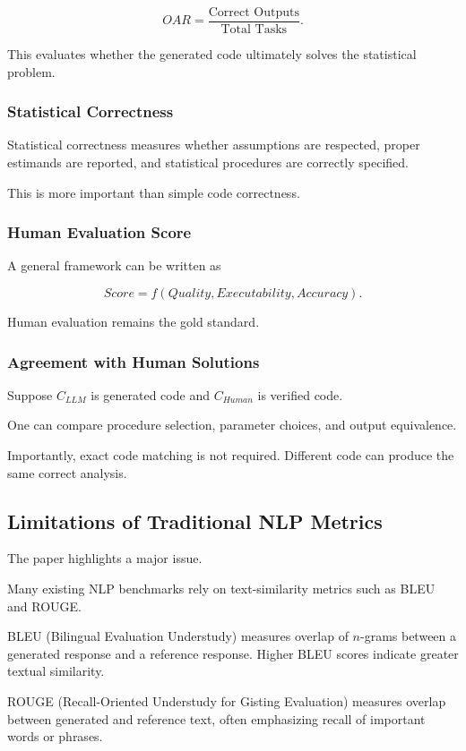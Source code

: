\documentclass[11pt]{article}
\begin{document}
\[OAR=\frac{\text{Correct Outputs}}{\text{Total Tasks}}.\]

This evaluates whether the generated code ultimately solves the statistical problem.

\subsubsection*{Statistical Correctness}

Statistical correctness measures whether assumptions are respected, proper estimands are reported, and statistical procedures are correctly specified.

This is more important than simple code correctness.

\subsubsection*{Human Evaluation Score}

A general framework can be written as

\[Score=f(Quality,Executability,Accuracy).\]

Human evaluation remains the gold standard.

\subsubsection*{Agreement with Human Solutions}

Suppose $C_{LLM}$ is generated code and $C_{Human}$ is verified code.

One can compare procedure selection, parameter choices, and output equivalence.

Importantly, exact code matching is not required. Different code can produce the same correct analysis.

\subsection*{Limitations of Traditional NLP Metrics}

The paper highlights a major issue.

Many existing NLP benchmarks rely on text-similarity metrics such as BLEU and ROUGE.

BLEU (Bilingual Evaluation Understudy) measures overlap of $n$-grams between a generated response and a reference response. Higher BLEU scores indicate greater textual similarity.

ROUGE (Recall-Oriented Understudy for Gisting Evaluation) measures overlap between generated and reference text, often emphasizing recall of important words or phrases.
\end{document}
